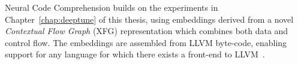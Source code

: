 Neural Code Comprehension builds on the experiments in Chapter~\ref{chap:deeptune} of this thesis, using embeddings derived from a novel \emph{Contextual Flow Graph} (XFG) representation which combines both data and control flow. The embeddings are assembled from LLVM byte-code, enabling support for any language for which there exists a front-end to LLVM~\cite{Ben-nun2018}.

